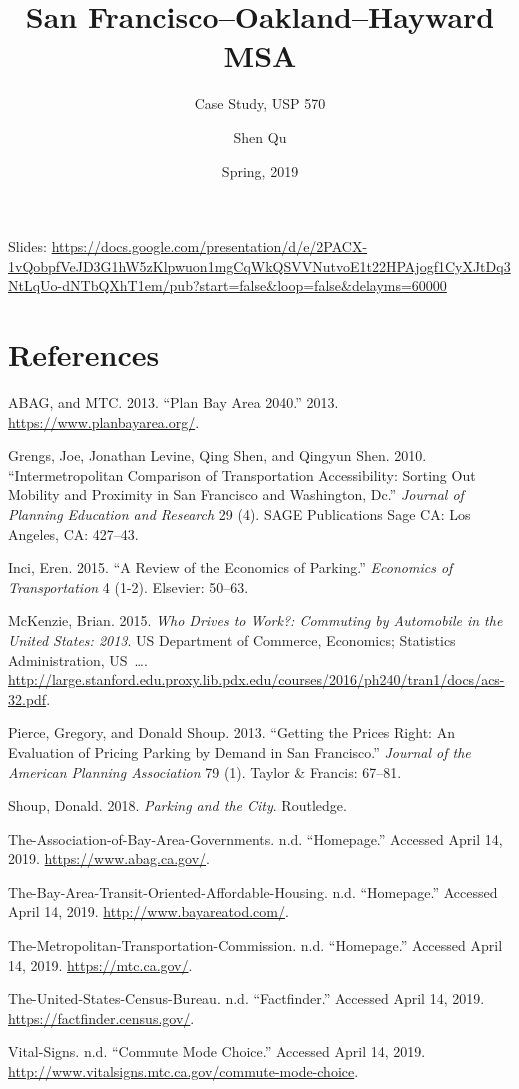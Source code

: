 \documentclass[12pt,]{article}
\title{San Francisco--Oakland--Hayward MSA}
\subtitle{Case Study, USP 570}
\author{Shen Qu}
\date{Spring, 2019}
\begin{document}
\maketitle

Slides:
\url{https://docs.google.com/presentation/d/e/2PACX-1vQobpfVeJD3G1hW5zKlpwuon1mgCqWkQSVVNutvoE1t22HPAjogf1CyXJtDq3NtLqUo-dNTbQXhT1em/pub?start=false\&loop=false\&delayms=60000}

\hypertarget{references}{%
\section*{References}\label{references}}

\hypertarget{refs}{}
\leavevmode\hypertarget{ref-ABAG2013plan}{}%
ABAG, and MTC. 2013. ``Plan Bay Area 2040.'' 2013.
\url{https://www.planbayarea.org/}.

\leavevmode\hypertarget{ref-grengs2010intermetropolitan}{}%
Grengs, Joe, Jonathan Levine, Qing Shen, and Qingyun Shen. 2010.
``Intermetropolitan Comparison of Transportation Accessibility: Sorting
Out Mobility and Proximity in San Francisco and Washington, Dc.''
\emph{Journal of Planning Education and Research} 29 (4). SAGE
Publications Sage CA: Los Angeles, CA: 427--43.

\leavevmode\hypertarget{ref-inci2015review}{}%
Inci, Eren. 2015. ``A Review of the Economics of Parking.''
\emph{Economics of Transportation} 4 (1-2). Elsevier: 50--63.

\leavevmode\hypertarget{ref-mckenzie2015drives}{}%
McKenzie, Brian. 2015. \emph{Who Drives to Work?: Commuting by
Automobile in the United States: 2013}. US Department of Commerce,
Economics; Statistics Administration, US~\ldots{}.
\url{http://large.stanford.edu.proxy.lib.pdx.edu/courses/2016/ph240/tran1/docs/acs-32.pdf}.

\leavevmode\hypertarget{ref-pierce2013getting}{}%
Pierce, Gregory, and Donald Shoup. 2013. ``Getting the Prices Right: An
Evaluation of Pricing Parking by Demand in San Francisco.''
\emph{Journal of the American Planning Association} 79 (1). Taylor \&
Francis: 67--81.

\leavevmode\hypertarget{ref-shoup2018parking}{}%
Shoup, Donald. 2018. \emph{Parking and the City}. Routledge.

\leavevmode\hypertarget{ref-ABAG}{}%
The-Association-of-Bay-Area-Governments. n.d. ``Homepage.'' Accessed
April 14, 2019. \url{https://www.abag.ca.gov/}.

\leavevmode\hypertarget{ref-TOAH}{}%
The-Bay-Area-Transit-Oriented-Affordable-Housing. n.d. ``Homepage.''
Accessed April 14, 2019. \url{http://www.bayareatod.com/}.

\leavevmode\hypertarget{ref-MTC}{}%
The-Metropolitan-Transportation-Commission. n.d. ``Homepage.'' Accessed
April 14, 2019. \url{https://mtc.ca.gov/}.

\leavevmode\hypertarget{ref-USCB}{}%
The-United-States-Census-Bureau. n.d. ``Factfinder.'' Accessed April 14,
2019. \url{https://factfinder.census.gov/}.

\leavevmode\hypertarget{ref-CMC}{}%
Vital-Signs. n.d. ``Commute Mode Choice.'' Accessed April 14, 2019.
\url{http://www.vitalsigns.mtc.ca.gov/commute-mode-choice}.
\end{document}
